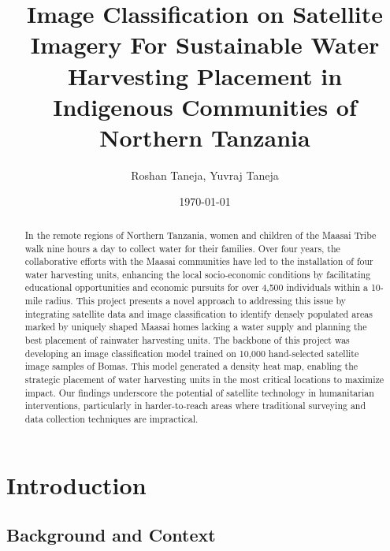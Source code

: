 \documentclass[10pt]{article}
\title{Image Classification on Satellite Imagery For Sustainable Water Harvesting Placement in Indigenous Communities of Northern Tanzania}
\author{Roshan Taneja, Yuvraj Taneja}
\date{\today}
\begin{document}
\maketitle

\begin{abstract}

In the remote regions of Northern Tanzania, women and children of the Maasai Tribe walk nine hours a day to collect water for their families. Over four years, the collaborative efforts with the Maasai communities have led to the installation of four water harvesting units, enhancing the local socio-economic conditions by facilitating educational opportunities and economic pursuits for over 4,500 individuals within a 10-mile radius. This project presents a novel approach to addressing this issue by integrating satellite data and image classification to identify densely populated areas marked by uniquely shaped Maasai homes lacking a water supply and planning the best placement of rainwater harvesting units. The backbone of this project was developing an image classification model trained on 10,000 hand-selected satellite image samples of Bomas. This model generated a density heat map, enabling the strategic placement of water harvesting units in the most critical locations to maximize impact. Our findings underscore the potential of satellite technology in humanitarian interventions, particularly in harder-to-reach areas where traditional surveying and data collection techniques are impractical.
    
\end{abstract}


\section{Introduction}

\subsection{Background and Context}
\end{document}
